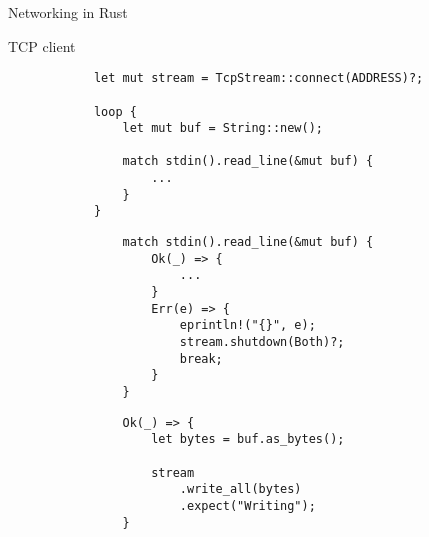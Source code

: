 \begin{frame}[fragile]{Networking in Rust}

    \begin{block}{TCP client}
        \begin{overprint}
            \begin{verbatim}
            let mut stream = TcpStream::connect(ADDRESS)?;

            loop {
                let mut buf = String::new();
            
                match stdin().read_line(&mut buf) {
                    ...
                }
            }
            \end{verbatim}

            \begin{verbatim}
                match stdin().read_line(&mut buf) {
                    Ok(_) => {
                        ...
                    }
                    Err(e) => {
                        eprintln!("{}", e);
                        stream.shutdown(Both)?;
                        break;
                    }
                }
            \end{verbatim}

            \begin{verbatim}
                Ok(_) => {
                    let bytes = buf.as_bytes();
        
                    stream
                        .write_all(bytes)
                        .expect("Writing");
                }
            \end{verbatim}
        \end{overprint}
    \end{block}
\end{frame}

